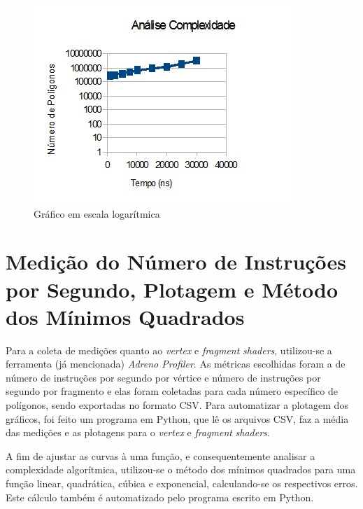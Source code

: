 	\begin{figure}[h]
	\centering
		\includegraphics[keepaspectratio=true,scale=1.0]{figuras/ndk_reta.jpg}
	\caption{Gráfico em escala logarítmica}
	\label{ndk_reta}
	\end{figure}

\section{Medição do Número de Instruções por Segundo, Plotagem e Método dos Mínimos Quadrados}

	Para a coleta de medições quanto ao \textit{vertex} e \textit{fragment} \textit{shaders}, utilizou-se a ferramenta (já mencionada) \textit{Adreno Profiler}. As métricas escolhidas foram a de número de instruções por segundo por vértice e número de instruções por segundo por fragmento e elas foram coletadas para cada número específico de polígonos, sendo exportadas no formato CSV. Para automatizar a plotagem dos gráficos, foi feito um programa em Python, que lê os arquivos CSV, faz a média das medições e as plotagens para o \textit{vertex} e \textit{fragment} \textit{shaders}. 

	A fim de ajustar as curvas à uma função, e consequentemente analisar a complexidade algorítmica, utilizou-se o método dos mínimos quadrados para uma função linear, quadrática, cúbica e exponencial, calculando-se os respectivos erros. Este cálculo também é automatizado pelo programa escrito em Python. 
 
